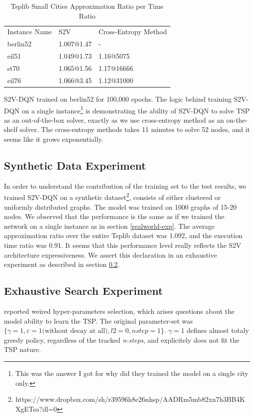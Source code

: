 \documentclass[10pt,a4paper,draft]{article}
\begin{document}
	\begin{table}[h] \centering
	\begin{tabular}{lll}
	 	Instance Name	& S2V   		& Cross-Entropy Method 	\\
	 	berlin52 		& 1.007@1.47	& - 					\\
		eil51  			& 1.049@1.73	& 1.16@5075				\\
		st70 			& 1.065@1.56 	& 1.17@16666 			\\
		eil76			& 1.066@3.45 	& 1.12@31000
	\end{tabular}
	\caption{Tsplib Small Cities Approximation Ratio per Time Ratio} 
	\label{tb_tsplib_performance_s2v_vs_ce}
	\small S2V-DQN trained on berlin52 for 100,000 epochs. The logic behind training S2V-DQN on a single instance\footnote{This was the answer I got for why did they trained the model on a single city only.} is demonstrating the ability of S2V-DQN to solve TSP as an out-of-the-box solver, exactly as we use cross-entropy method as an on-the-shelf solver. The cross-entropy methods takes 11 minutes to solve 52 nodes, and it seems like it grows exponentially.
	\end{table}

 

\subsection{Synthetic Data Experiment}
In order to understand the contribution of the training set to the test results, we trained S2V-DQN on a synthetic dataset\footnote{https://www.dropbox.com/sh/r39596h8e26nhsp/AADRm5mb82xn7h3BB4KXgETsa?dl=0}, consists of either clustered or uniformly distributed graphs. The model was trained on 1000 graphs of 15-20 nodes. We observed that the performance is the same as if we trained the network on a single instance as in section \ref{realworld-exp}. The average approximation ratio over the entire Tsplib dataset was 1.092, and the execution time ratio was 0.91. It seems that this performance level really reflects the S2V architecture expressiveness. We assert this declaration in an exhaustive experiment as described in section \ref{exhaustive-search-exp}.

\subsection{Exhaustive Search Experiment} \label{exhaustive-search-exp}
\cite{dai17-tsp-s2v} reported weired hyper-parameters selection, which arises questions about the model ability to learn the TSP. The original parameter-set was $\{\gamma=1, \varepsilon=1 \text{(without decay at all)}, l2=0, nstep=1\}$. $\gamma=1$ defines almost totaly greedy policy, regardless of the tracked \textit{n-steps}, and explicitely does not fit the TSP nature. 
\end{document}

